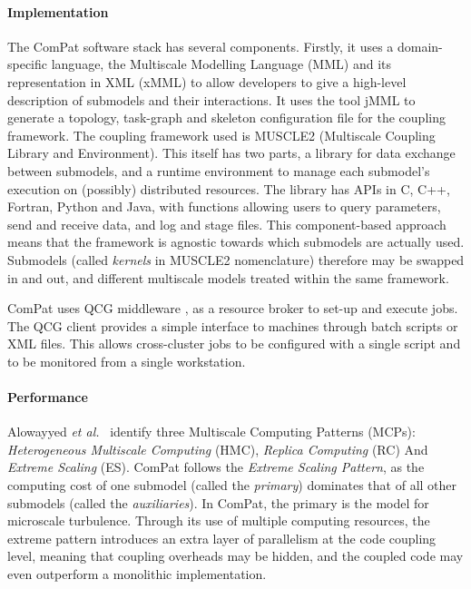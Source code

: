 \paragraph{Implementation}

The ComPat software stack has several components.
Firstly, it uses a domain-specific language, the Multiscale Modelling Language
(MML) and its representation in XML (xMML) to allow developers to give a
high-level description of submodels and their interactions.
It uses the tool jMML to generate a topology, task-graph and skeleton
configuration file for the coupling framework.
The coupling framework used is MUSCLE2 (Multiscale Coupling Library and
Environment).
This itself has two parts, a library for data exchange between submodels, and a
runtime environment to manage each submodel's execution on (possibly)
distributed resources.
The library has APIs in C, C++, Fortran, Python and Java, with functions
allowing users to query parameters, send and receive data, and log and stage
files.
This component-based approach means that the framework is agnostic towards
which submodels are actually used.
Submodels (called \emph{kernels} in MUSCLE2 nomenclature) therefore may be
swapped in and out, and different multiscale models treated within the same
framework.

ComPat uses QCG middleware \cite{qcgwebsite}, as a resource broker to set-up
and execute jobs.
The QCG client provides a simple interface to machines through batch scripts or
XML files.
This allows cross-cluster jobs to be configured with a single script and to be
monitored from a single workstation.

\paragraph{Performance}

Alowayyed \emph{et al.}\ \cite{Al17Mult} identify three Multiscale Computing Patterns (MCPs):
{\it Heterogeneous Multiscale Computing} (HMC),
{\it Replica Computing} (RC) And
{\it Extreme Scaling} (ES).
ComPat follows the {\it Extreme Scaling Pattern}, as the computing cost of one
submodel (called the \emph{primary}) dominates that of all other submodels
(called the \emph{auxiliaries}).
In ComPat, the primary is the model for microscale turbulence.
Through its use of multiple computing resources, the extreme pattern introduces
an extra layer of parallelism at the code coupling level, meaning that coupling
overheads may be hidden, and the coupled code may even outperform a monolithic
implementation.

